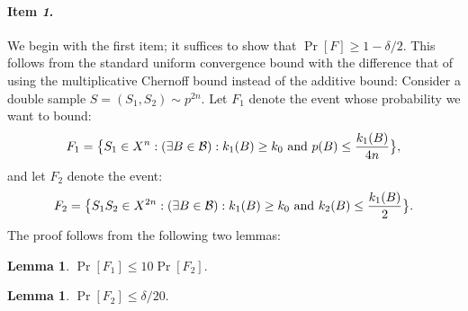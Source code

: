 \documentclass{article}
\newtheorem{lemma}[theorem]{Lemma}
\newcommand{\B}{{\cal B}}
\newcommand{\samp}{S}
\begin{document}
\paragraph{Item {\it 1}.}
We begin with the first item;
it suffices to show that $\Pr[F]\geq 1-\delta/2$.
This follows from the standard uniform convergence bound with
the difference that of using the multiplicative Chernoff bound instead
of the additive bound:
Consider a double sample $S=(\samp_1,\samp_2)\sim p^{2n}$.
Let $F_1$ denote the event whose probability we want to bound:
\[
F_1 =\bigl\{ S_1\in X^n : (\exists {B\in\B}):
  k_{1}(B) \geq k_0 \mbox{ and } p(B) \leq \frac{k_{1}(B)}{4n}\bigr\}, 
\]
and let $F_2$ denote the event:
\[
F_2 = 
\bigl\{ S_1S_2\in X^{2n} : (\exists {B\in\B}):
  k_{1}(B) \geq k_0 \mbox{ and } k_{2}(B) \leq \frac{k_{1}(B)}{2}\bigr\}.
\]
The proof follows from the following two lemmas:
\begin{lemma}\label{lem:aux11}
$\Pr[F_1]\leq 10\Pr[F_2].$
\end{lemma}
\begin{lemma}\label{lem:aux12}
$\Pr[F_2]\leq \delta/20.$
\end{lemma}
\end{document}
